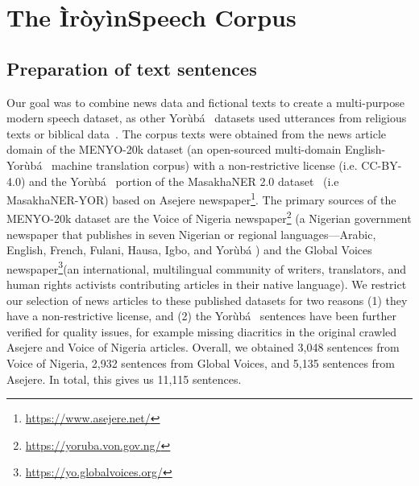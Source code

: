 \documentclass{article}
\newcommand{\Yoruba}{Yor\`{u}b\'{a} }
\newcommand{\yoruba}{Yor\`{u}b\'{a} \ }
\begin{document}
\section{The \`{I}r\`{o}y\`{i}nSpeech Corpus}
\label{sec:corp-creation}
\subsection{Preparation of text sentences}
Our goal was to combine news data and fictional texts to create a multi-purpose modern speech dataset, as other \yoruba datasets used utterances from religious texts or biblical data~\cite{gutkin_49562,meyer22c_interspeech}. The corpus texts were obtained from %
the news article domain of the MENYO-20k dataset \cite{adelani-etal-2021-effect} (an open-sourced multi-domain English-\yoruba machine translation corpus) with a non-restrictive license (i.e. CC-BY-4.0) and the \yoruba portion of the MasakhaNER 2.0 dataset~\cite{adelani-etal-2022-masakhaner} (i.e MasakhaNER-YOR) based on Asejere newspaper\footnote{\url{https://www.asejere.net/}}. The primary sources of the MENYO-20k dataset are the Voice of Nigeria newspaper\footnote{\url{https://yoruba.von.gov.ng/}} (a Nigerian government newspaper that publishes in seven Nigerian or regional languages---Arabic, English, French, Fulani, Hausa, Igbo, and \Yoruba) and the Global Voices newspaper\footnote{\url{https://yo.globalvoices.org/}}(an international, multilingual community of writers, translators, and human rights activists contributing articles in their native language). We restrict our selection of news articles to these published datasets for two reasons (1) they have a non-restrictive license, and  (2) the \yoruba sentences have been further verified for quality issues, for example missing diacritics in the original crawled Asejere and Voice of Nigeria articles. Overall, we obtained 3,048 sentences from Voice of Nigeria, 2,932 sentences from Global Voices, and 5,135 sentences from Asejere. In total, this gives us 11,115 sentences.
\end{document}
